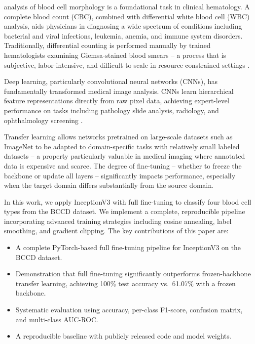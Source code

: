 \documentclass[conference]{IEEEtran}
\begin{document}
 analysis of blood cell morphology is a foundational task in clinical hematology. A complete blood count (CBC), combined with differential white blood cell (WBC) analysis, aids physicians in diagnosing a wide spectrum of conditions including bacterial and viral infections, leukemia, anemia, and immune system disorders. Traditionally, differential counting is performed manually by trained hematologists examining Giemsa-stained blood smears -- a process that is subjective, labor-intensive, and difficult to scale in resource-constrained settings \cite{lecun2015}.

Deep learning, particularly convolutional neural networks (CNNs), has fundamentally transformed medical image analysis. CNNs learn hierarchical feature representations directly from raw pixel data, achieving expert-level performance on tasks including pathology slide analysis, radiology, and ophthalmology screening \cite{esteva2017}.

Transfer learning allows networks pretrained on large-scale datasets such as ImageNet to be adapted to domain-specific tasks with relatively small labeled datasets -- a property particularly valuable in medical imaging where annotated data is expensive and scarce. The degree of fine-tuning -- whether to freeze the backbone or update all layers -- significantly impacts performance, especially when the target domain differs substantially from the source domain.

In this work, we apply InceptionV3 \cite{szegedy2016} with full fine-tuning to classify four blood cell types from the BCCD dataset. We implement a complete, reproducible pipeline incorporating advanced training strategies including cosine annealing, label smoothing, and gradient clipping. The key contributions of this paper are:
\begin{itemize}
  \item A complete PyTorch-based full fine-tuning pipeline for InceptionV3 on the BCCD dataset.
  \item Demonstration that full fine-tuning significantly outperforms frozen-backbone transfer learning, achieving 100\% test accuracy vs.\ 61.07\% with a frozen backbone.
  \item Systematic evaluation using accuracy, per-class F1-score, confusion matrix, and multi-class AUC-ROC.
  \item A reproducible baseline with publicly released code and model weights.
\end{itemize}
\end{document}
